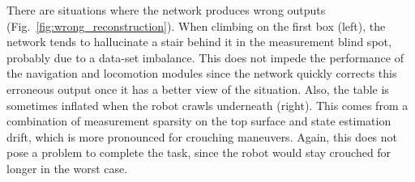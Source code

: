 \documentclass[conference]{IEEEtran}
\begin{document}
There are situations where the network produces wrong outputs (Fig.~\ref{fig:wrong_reconstruction}). When climbing on the first box (left), the network tends to hallucinate a stair behind it in the measurement blind spot, probably due to a data-set imbalance. This does not impede the performance of the navigation and locomotion modules since the network quickly corrects this erroneous output once it has a better view of the situation. Also, the table is sometimes inflated when the robot crawls underneath (right). This comes from a combination of measurement sparsity on the top surface and state estimation drift, which is more pronounced for crouching maneuvers. Again, this does not pose a problem to complete the task, since the robot would stay crouched for longer in the worst case. 
\end{document}
